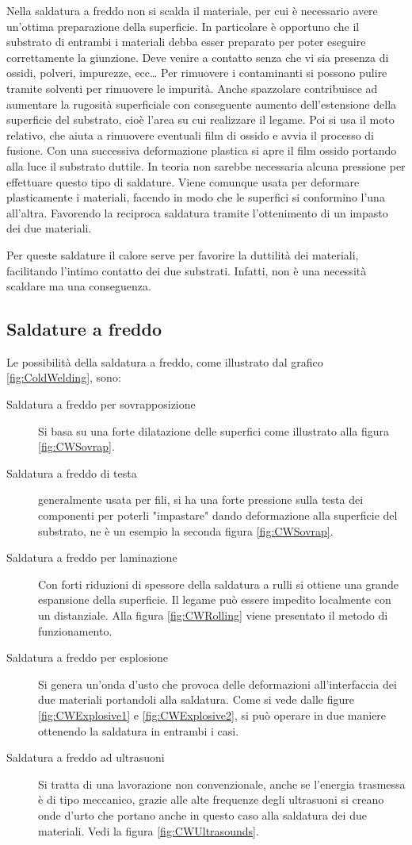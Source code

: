 Nella saldatura a freddo non si scalda il materiale, per cui è necessario avere un'ottima preparazione della superficie.
In particolare è opportuno che il substrato di entrambi i materiali debba esser preparato per poter eseguire correttamente la giunzione.
Deve venire a contatto senza che vi sia presenza di ossidi, polveri, impurezze, ecc\dots
Per rimuovere i contaminanti si possono pulire tramite solventi per rimuovere le impurità. Anche spazzolare contribuisce ad aumentare la rugosità superficiale con conseguente aumento dell'estensione della superficie del substrato, cioè l'area su cui realizzare il legame.
Poi si usa il moto relativo, che aiuta a rimuovere eventuali film di ossido e avvia il processo di fusione.
Con una successiva deformazione plastica si apre il film ossido portando alla luce il substrato duttile.
In teoria non sarebbe necessaria alcuna pressione per effettuare questo tipo di saldature. 
Viene comunque usata per deformare plasticamente i materiali, facendo in modo che le superfici si conformino l'una all'altra.
Favorendo la reciproca saldatura tramite l'ottenimento di un impasto  dei due materiali.

Per queste saldature il calore serve per favorire la duttilità dei materiali, facilitando l'intimo contatto dei due substrati.
Infatti, non è una necessità scaldare ma una conseguenza.

\subsection{Saldature a freddo}
Le possibilità della saldatura a freddo, come illustrato dal grafico \ref{fig:ColdWelding}, sono:
\begin{description}
\item[Saldatura a freddo per sovrapposizione]Si basa su una forte dilatazione delle superfici come illustrato alla figura \ref{fig:CWSovrap}.
\item[Saldatura a freddo di testa] generalmente usata per fili, si ha una forte pressione sulla testa dei componenti per poterli "impastare" dando deformazione alla superficie del substrato, ne è un esempio la seconda figura \ref{fig:CWSovrap}.
\item[Saldatura a freddo per laminazione] Con forti riduzioni di spessore della saldatura a rulli si ottiene una grande espansione della superficie. Il legame può essere impedito localmente con un distanziale.
Alla figura \ref{fig:CWRolling} viene presentato il metodo di funzionamento.
\item[Saldatura a freddo per esplosione] Si genera un'onda d'usto che provoca delle deformazioni all'interfaccia dei due materiali portandoli alla saldatura. Come si vede dalle figure \ref{fig:CWExplosive1} e \ref{fig:CWExplosive2}, si può operare in due maniere ottenendo la saldatura in entrambi i casi.
\item[Saldatura a freddo ad ultrasuoni] Si tratta di una lavorazione non convenzionale, anche se l'energia trasmessa è di tipo meccanico, grazie alle alte frequenze degli ultrasuoni si creano onde d'urto che portano anche in questo caso alla saldatura dei due materiali.
Vedi la figura \ref{fig:CWUltrasounds}. 
\end{description}


